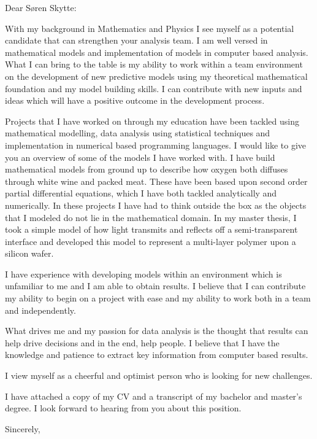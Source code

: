 \documentclass[10pt,a4paper]{letter}
\begin{document}
\begin{letter}{}
\opening{Dear Søren Skytte:}

With my background in Mathematics and Physics I see myself as a potential candidate that can strengthen your analysis team. I am well versed in mathematical models and implementation of models in computer based analysis. What I can bring to the table is my ability to work within a team environment on the development of new predictive models using my theoretical mathematical foundation and my model building skills. I can contribute with new inputs and ideas which will have a positive outcome in the development process.

Projects that I have worked on through my education have been tackled using mathematical modelling, data analysis using statistical techniques and implementation in numerical based programming languages. I would like to give you an overview of some of the models I have worked with. I have build mathematical models from ground up to describe how oxygen both diffuses through white wine and packed meat. These have been based upon second order partial differential equations, which I have both tackled analytically and numerically. In these projects I have had to think outside the box as the objects that I modeled do not lie in the mathematical domain. In my master thesis, I took a simple model of how light transmits and reflects off a semi-transparent interface and developed this model to represent a multi-layer polymer upon a silicon wafer. 

I have experience with developing models within an environment which is unfamiliar to me and I am able to obtain results. I believe that I can contribute my ability to begin on a project with ease and my ability to work both in a team and independently. 

What drives me and my passion for data analysis is the thought that results can help drive decisions and in the end, help people. I believe that I have the knowledge and patience to extract key information from computer based results.      

I view myself as a cheerful and optimist person who is looking for new challenges.

I have attached a copy of my CV and a transcript of my bachelor and master's degree. I look forward to hearing from you about this position.   

\closing{Sincerely,}

\end{letter}

\end{document}
